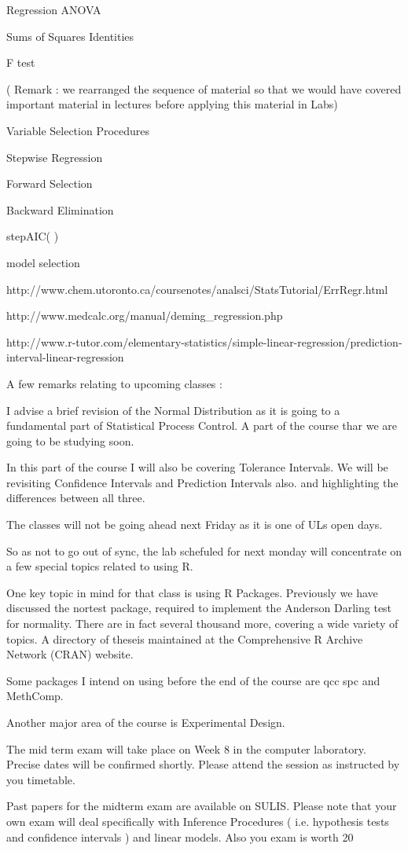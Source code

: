  

Regression ANOVA

Sums of Squares Identities

F test

( Remark : we rearranged the sequence of material so that we would have covered important material in lectures before applying this material in Labs)


Variable Selection Procedures

Stepwise Regression

Forward Selection

Backward Elimination

stepAIC( )

model selection


http://www.chem.utoronto.ca/coursenotes/analsci/StatsTutorial/ErrRegr.html

http://www.medcalc.org/manual/deming_regression.php



http://www.r-tutor.com/elementary-statistics/simple-linear-regression/prediction-interval-linear-regression


A few remarks relating to upcoming classes  :


I advise a brief revision of the Normal Distribution as it is going to a fundamental part of  Statistical Process Control. A part of the course thar we are going to be studying soon.


In this part of the course I will also be covering Tolerance Intervals. We will be revisiting Confidence Intervals and Prediction Intervals also. and highlighting the differences between all three.


The classes will not be going ahead next Friday as it is one of ULs open days.

So as not to go out of sync, the lab schefuled for next monday will concentrate on a few special topics related to using R.


One key topic in mind for that class is using R Packages. Previously we have discussed  the nortest package, required to implement the Anderson Darling test for normality. There are in fact several thousand more, covering a wide variety of topics. A directory of theseis maintained at the Comprehensive R Archive Network (CRAN) website.


Some packages I intend on using before the end of the course are qcc spc and MethComp.


Another major area of the course is Experimental Design.


The mid term exam will take place on Week 8 in the computer laboratory.  Precise dates will be confirmed shortly. Please attend the session as instructed by you timetable.


Past papers for the midterm exam are available on SULIS. Please note that your own exam will deal specifically with Inference Procedures ( i.e. hypothesis tests and confidence intervals  ) and linear models. Also you exam is worth 20%






